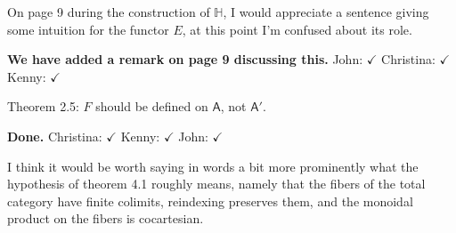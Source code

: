\documentclass[reqno]{amsart}
\def\chris{\color{purple} Christina: }
\def\john{\color{red} John: }
\def\kenny{\color{blue} Kenny: }
\begin{document}
\begin{enumerate}
{\item On page 9 during the construction of $\mathbb{H}$, I would appreciate a sentence giving some intuition for the functor $E$, at this point I’m confused about  its  role.

{\bf  We have added a remark on page 9 discussing this.}  {\john $\checkmark$} {\chris $\checkmark$} {\kenny $\checkmark$}

\iffalse
{\color{blue}{Kenny: We don't have any examples where $E$ is not an identity, but in my mind it's a functor that possibly modifies decorations, e.g. 
$F(a)$ is a category of graph structures on $a$, and $E(F(a))$ could be something like a category of possibly labeled graph structures on $a$, if 
that 
makes sense. Something potentially different than \emph{just} a graph structure on $a$.}}

{\chris Right! We can perhaps add a sentence to this end, saying that although we only use E as an identity, someone could need to change 
decorations 
for some application?}

{\kenny Sure, maybe sometime before the official statement of the Theorem when we're describing how the double functor $\mathbb{H}$ is defined?}

{\chris Sounds good to me!}

{\kenny I've added a long run-on sentence beneath the square on page 9 trying to say more about the functors $H$ and $E$ from an intuitive standpoint. Edit at will.}

{\john I edited it --- take a looks, folks and see if you're happy. I'm gonna give this one my check mark.  I actually think the referee's implicit point is right: it'd be more natural in some ways to require $E$ to be the identity, so we'd be working in the 2-category of categories over $\mathsf{Cat}$ and lax maps between these.  But I think we can stick with what we've got,
which is more general.}

{\kenny Looks good to me.}
\fi

\item Theorem 2.5: $F$ should be defined on $\mathsf{A}$, not $\mathsf{A}'$.

{\bf Done.} {\chris $\checkmark$} {\kenny $\checkmark$} {\john $\checkmark$}

\item I think it would be worth saying in words a bit more prominently what the hypothesis of theorem 4.1 roughly means, namely that the fibers of 
the total 
category have finite colimits, reindexing preserves them, and the monoidal product on the fibers is cocartesian.

}
\end{enumerate}
\end{document}
